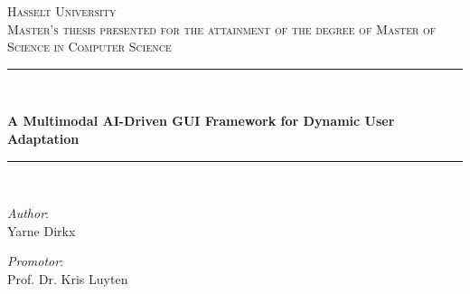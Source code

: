 \documentclass[openany]{book}
\begin{document}
\begin{titlepage}

\newcommand{\HRule}{\rule{\linewidth}{0.5mm}} %

\center
 

\textsc{\LARGE Hasselt University}\\[1.0cm]
\textsc{\Large Master's thesis presented for the attainment of the degree of Master of Science in Computer Science}\\[0.5cm]

\HRule \\[0.2cm]
{ \huge  \bfseries A Multimodal AI-Driven GUI Framework for Dynamic User Adaptation \par} 
\HRule \\[1.5cm]
 

\begin{minipage}[t]{0.5\textwidth}
    \begin{flushleft}
        \large \textit{Author}:\vspace*{0.5cm} \\
        Yarne Dirkx
    \end{flushleft}
\end{minipage}%
%
\begin{minipage}[t]{0.5\textwidth}
    \begin{flushright}
        \large \textit{Promotor}:\vspace*{0.5cm} \\
        Prof. Dr. Kris Luyten\\
        \vspace*{0.5cm}
    \end{flushright}
\end{minipage}

\vspace*{1cm}


\end{titlepage}
\end{document}
